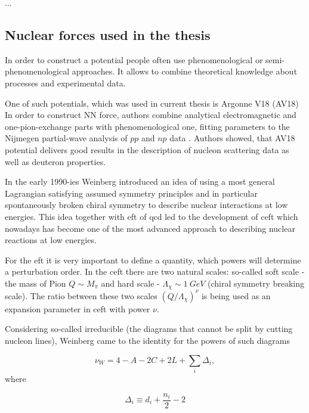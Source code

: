 ...
\subsection*{Nuclear forces used in the thesis}

In order to construct a potential people often use phenomenological
or semi-phenomenological approaches. It allows to combine
theoretical knowledge about processes and experimental data.

One of such potentials, which was used in current thesis is Argonne V18 (AV18) \cite{AV18Wiringa} 
In order to construct NN force, authors combine
analytical electromagnetic and one-pion-exchange parts
with phenomenological one, fitting parameters to
the Nijmegen partial-wave analysis of $pp$ and $np$ data \cite{NijmegenPhysRevC.48.792}. 
Authors showed, that AV18 potential delivers good results
in the description of nucleon scattering data as well as deuteron 
properties. 


In the early 1990-ies Weinberg \cite{WEINBERG1990,WEINBERG1991} introduced 
an idea of using a most general Lagrangian
satisfying assumed symmetry principles and in particular
spontaneously broken chiral symmetry to 
describe nuclear interactions at low energies.
This idea together with \gls*{eft} of \gls*{qcd} 
led to the development of \gls*{ceft}
which nowadays has become one of the most advanced approach to
describing nuclear reactions at low energies.
 
For the \gls*{eft} it is very important to 
define a quantity, which powers will determine a perturbation order.
In the \gls*{ceft} there are two natural scales: so-called soft scale -
the mass of Pion $Q \sim M_\pi$ and hard scale -
$\Lambda_\chi \sim 1~GeV$ (chiral symmetry breaking scale).
The ratio between these two scales $(Q/\Lambda_\chi)^\nu$
is being used as an expansion parameter in  \gls*{ceft} with power
$\nu$.

Considering so-called irreducible (the diagrams that cannot be split
by cutting nucleon lines), Weinberg \cite{WEINBERG1990,WEINBERG1991}
came to the identity for the powers of such diagrams

\begin{equation}
    \nu_W = 4 - A - 2C + 2L + \sum_i \Delta_i,
    \label{powers}
\end{equation}
where

\begin{equation}
    \Delta_i \equiv d_i + \frac{n_i}{2} - 2
    \label{Delta}
\end{equation}

